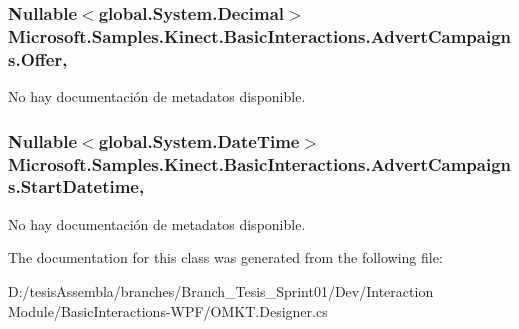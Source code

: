 \hypertarget{class_microsoft_1_1_samples_1_1_kinect_1_1_basic_interactions_1_1_advert_campaigns_a3b187f9be58904bc3c0d384b4f0f8c3c}{
\subsubsection[{Offer}]{\setlength{\rightskip}{0pt plus 5cm}Nullable$<$global.\-System.\-Decimal$>$ Microsoft.\-Samples.\-Kinect.\-Basic\-Interactions.\-Advert\-Campaigns.\-Offer\hspace{0.3cm}{\ttfamily [get]}, {\ttfamily [set]}}}\label{class_microsoft_1_1_samples_1_1_kinect_1_1_basic_interactions_1_1_advert_campaigns_a3b187f9be58904bc3c0d384b4f0f8c3c}


No hay documentación de metadatos disponible. 

\hypertarget{class_microsoft_1_1_samples_1_1_kinect_1_1_basic_interactions_1_1_advert_campaigns_a31321c7dc66a8e4746aa011bb0bfc383}{
\subsubsection[{Start\-Datetime}]{\setlength{\rightskip}{0pt plus 5cm}Nullable$<$global.\-System.\-Date\-Time$>$ Microsoft.\-Samples.\-Kinect.\-Basic\-Interactions.\-Advert\-Campaigns.\-Start\-Datetime\hspace{0.3cm}{\ttfamily [get]}, {\ttfamily [set]}}}\label{class_microsoft_1_1_samples_1_1_kinect_1_1_basic_interactions_1_1_advert_campaigns_a31321c7dc66a8e4746aa011bb0bfc383}


No hay documentación de metadatos disponible. 



The documentation for this class was generated from the following file\-:\begin{DoxyCompactItemize}
\item 
D\-:/tesis\-Assembla/branches/\-Branch\-\_\-\-Tesis\-\_\-\-Sprint01/\-Dev/\-Interaction Module/\-Basic\-Interactions-\/\-W\-P\-F/O\-M\-K\-T.\-Designer.\-cs\end{DoxyCompactItemize}
